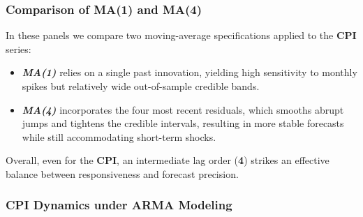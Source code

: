 \documentclass{Configuration_Files/PoliMi3i_thesis}
\begin{document}
\subsubsection*{Comparison of MA(1) and MA(4)}

In these panels we compare two moving-average specifications applied to the \textbf{CPI} series:
\begin{itemize}
  \item \textbf{\textit{MA(1)}} relies on a single past innovation, yielding high sensitivity to monthly spikes but relatively wide out-of-sample credible bands.
  \item \textbf{\textit{MA(4)}} incorporates the four most recent residuals, which smooths abrupt jumps and tightens the credible intervals, resulting in more stable forecasts while still accommodating short-term shocks.
\end{itemize}

Overall, even for the \textbf{CPI}, an intermediate lag order (\textbf{4}) strikes an effective balance between responsiveness and forecast precision.



\subsubsection{CPI Dynamics under ARMA Modeling}
\end{document}
